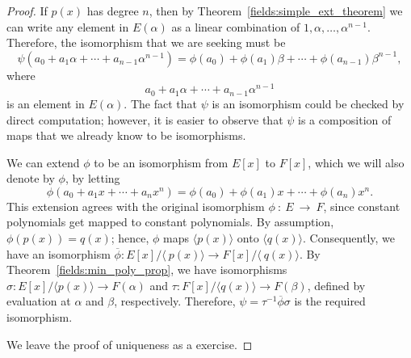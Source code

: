 \begin{proof}
If $p(x)$ has degree $n$, then by Theorem~\ref{fields:simple_ext_theorem} we can write any
element in $E( \alpha )$ as a linear combination of $1, \alpha,
\ldots, \alpha^{n-1}$. Therefore, the isomorphism that we are seeking
must be   
\[
\psi( a_0 + a_1 \alpha + \cdots + a_{n-1} \alpha^{n-1})
= \phi(a_0) + \phi(a_1) \beta + \cdots + \phi(a_{n-1}) \beta^{n-1}, 
\]
where 
\[
a_0 + a_1 \alpha + \cdots + a_{n-1} \alpha^{n-1}
\]
is an
element in $E(\alpha)$. The fact that $\psi$ is an isomorphism could
be checked by direct computation; however, it is easier to observe
that $\psi$ is a composition of maps that we already know to be 
isomorphisms.   

We can extend $\phi$ to be an isomorphism from $E[x]$ to $F[x]$, which
we will also denote by $\phi$, by letting
\[
\phi( a_0 + a_1 x + \cdots + a_n x^n )
= 
\phi( a_0 ) + \phi(a_1) x + \cdots + \phi(a_n) x^n.
\]
This extension agrees with the original isomorphism
$\phi~:~E~\rightarrow~F$, since constant polynomials get mapped to
constant polynomials.  By assumption, $\phi(p(x)) = q(x)$; hence,
$\phi$ maps $\langle p(x) \rangle$ onto $\langle q(x) \rangle$.
Consequently, we have an isomorphism
\mbox{$\overline{\phi} : E[x] / \langle~p(x) \rangle \rightarrow
F[x]/\langle~q(x) \rangle$}. By Theorem~\ref{fields:min_poly_prop}, we have 
isomorphisms
\mbox{$\sigma: E[x]/\langle p(x) \rangle \rightarrow F(\alpha)$} and
\mbox{$\tau : F[x]/\langle q(x) \rangle \rightarrow F( \beta )$},
defined by evaluation at $\alpha$ and $\beta$, respectively.
Therefore, $\psi = \tau^{-1} \overline{\phi} \sigma$ is the required
isomorphism.

\begin{center}
\end{center}

We leave the proof of uniqueness as a exercise.
\end{proof}

